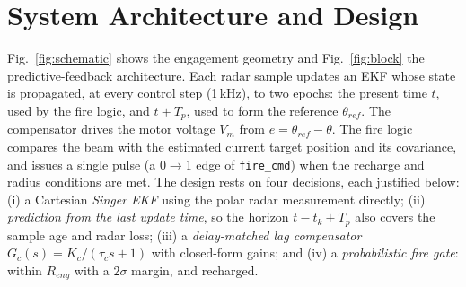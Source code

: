 \documentclass[conference]{IEEEtran}
\newcommand{\Tp}{T_p}
\begin{document}
\section{System Architecture and Design}
Fig.~\ref{fig:schematic} shows the engagement geometry and Fig.~\ref{fig:block}
the predictive-feedback architecture. Each radar sample updates an EKF whose
state is propagated, at every control step (1\,kHz), to two epochs: the present
time $t$, used by the fire logic, and $t+\Tp$, used to form the reference
$\theta_{ref}$. The compensator drives the motor voltage $V_m$ from
$e=\theta_{ref}-\theta$. The fire logic compares the beam with the estimated
current target position and its covariance, and issues a single pulse (a 0$\to$1
edge of \texttt{fire\_cmd}) when the recharge and radius conditions are met.
The design rests on four decisions, each justified below: (i) a Cartesian
\emph{Singer EKF} using the polar radar measurement directly; (ii)
\emph{prediction from the last update time}, so the horizon $t-t_k+\Tp$ also
covers the sample age and radar loss; (iii) a \emph{delay-matched lag
compensator} $G_c(s)=K_c/(\tau_c s+1)$ with closed-form gains; and (iv) a
\emph{probabilistic fire gate}: within $R_{eng}$ with a $2\sigma$ margin, and
recharged.
\end{document}
